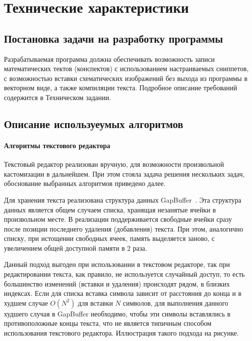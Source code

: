 \documentclass[explnote]{espd}
\begin{document}
\section{Технические характеристики}
\subsection{Постановка задачи на разработку программы}
Разрабатываемая программа должна обеспечивать возможность записи математических тектов (конспектов) с использованием настраиваемых сниппетов, с возможностью вставки схематических изображений без выхода из программы в векторном виде, а также компиляции текста. Подробное описание требований содержится в Техническом задании.

\subsection{Описание используеумых алгоритмов}
\paragraph{Алгоритмы текстового редактора}
Текстовый редактор реализован вручную, для возможности произвольной кастомизации в дальнейшем. При этом стояла задача решения нескольких задач, обоснование выбранных алгоритмов приведено далее.

Для хранения текста реализована структура данных GapBuffer~\cite{gapbuffer}.  Эта структура данных является общем случаем списка, хранящая незанятые ячейки в произвольном месте. В реализации поддерживается свободные ячейки сразу после позиции последнего удаления (добавления) текста. При этом, аналогично списку, при истощении свободных ячеек, память выделяется заново, с увеличением общей доступной памяти в 2 раза.

Данный подход выгоден при использовании в текстовом редакторе, так при редактировании текста, как правило, не используется случайный доступ, то есть большинство изменений (вставки и удаления) происходят рядом, в близких индексах. Если для списка вставка символа зависит от расстояния до конца и в худшем случае $O(N^2)$ для вставки $N$ символов, для выполнения данного худшего случая в GapBuffer необходимо, чтобы эти символы вставлялись в противоположные концы текста, что не является типичным способом использования текстового редактора. Иллюстрация такого подхода на рисунке.

\end{document}

